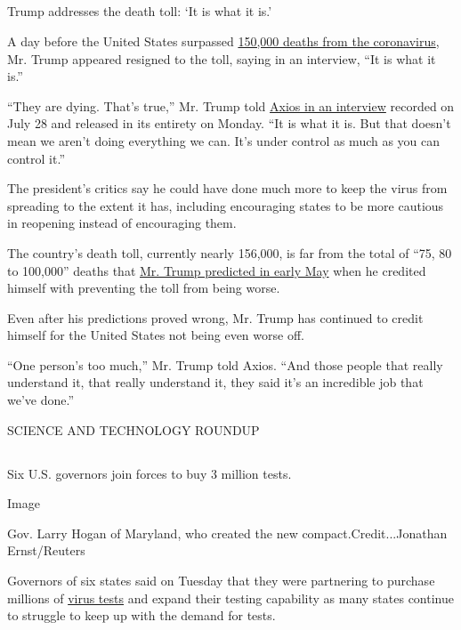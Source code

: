\hypertarget{-8}{%
\subsection{}\label{-8}}

Trump addresses the death toll: `It is what it is.'

A day before the United States surpassed
\href{https://www.nytimes.com/2020/07/29/us/coronavirus-deaths-150000.html}{150,000
deaths from the coronavirus}, Mr. Trump appeared resigned to the toll,
saying in an interview, ``It is what it is.''

``They are dying. That's true,'' Mr. Trump told
\href{https://www.axios.com/full-axios-hbo-interview-donald-trump-cd5a67e1-6ba1-46c8-bb3d-8717ab9f3cc5.html}{Axios
in an interview} recorded on July 28 and released in its entirety on
Monday. ``It is what it is. But that doesn't mean we aren't doing
everything we can. It's under control as much as you can control it.''

The president's critics say he could have done much more to keep the
virus from spreading to the extent it has, including encouraging states
to be more cautious in reopening instead of encouraging them.

The country's death toll, currently nearly 156,000, is far from the
total of ``75, 80 to 100,000'' deaths that
\href{https://www.nytimes.com/2020/05/03/us/politics/trump-coronavirus.html}{Mr.
Trump predicted in early May} when he credited himself with preventing
the toll from being worse.

Even after his predictions proved wrong, Mr. Trump has continued to
credit himself for the United States not being even worse off.

``One person's too much,'' Mr. Trump told Axios. ``And those people that
really understand it, that really understand it, they said it's an
incredible job that we've done.''

SCIENCE AND TECHNOLOGY ROUNDUP

\hypertarget{-9}{%
\subsection{}\label{-9}}

Six U.S. governors join forces to buy 3 million tests.

Image

Gov. Larry Hogan of Maryland, who created the new
compact.Credit...Jonathan Ernst/Reuters

Governors of six states said on Tuesday that they were partnering to
purchase millions of
\href{https://www.nytimes.com/2020/08/04/us/virus-testing-delays.html}{virus
tests} and expand their testing capability as many states continue to
struggle to keep up with the demand for tests.

